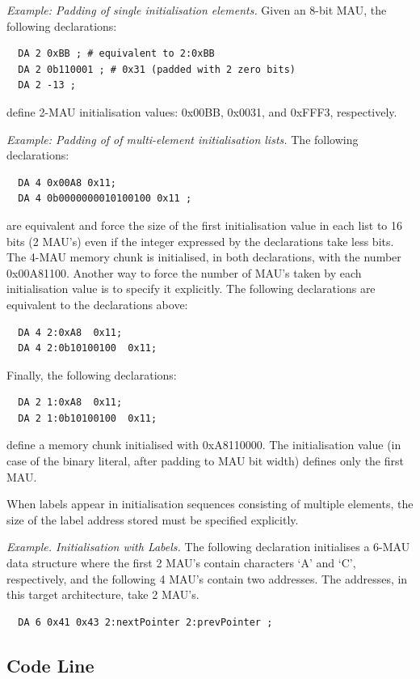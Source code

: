 \documentclass[a4paper,twoside]{tceusermanual}
\begin{document}
\emph{Example: Padding of single initialisation elements.}
%
Given an 8-bit MAU, the following declarations:
\begin{verbatim}
  DA 2 0xBB ; # equivalent to 2:0xBB
  DA 2 0b110001 ; # 0x31 (padded with 2 zero bits)
  DA 2 -13 ;
\end{verbatim}
define 2-MAU initialisation values: 0x00BB, 0x0031, and 0xFFF3,
respectively.

\emph{Example: Padding of of multi-element initialisation lists.}
%
The following declarations:
\begin{verbatim}
  DA 4 0x00A8 0x11;
  DA 4 0b0000000010100100 0x11 ;
\end{verbatim}
are equivalent and force the size of the first initialisation value in each
list to 16 bits (2 MAU's) even if the integer expressed by the declarations
take less bits. The 4-MAU memory chunk is initialised, in both declarations,
with the number 0x00A81100.
%
Another way to force the number of MAU's taken by each initialisation value
is to specify it explicitly.
%
The following declarations are equivalent to the declarations above:
\begin{verbatim}
  DA 4 2:0xA8  0x11;
  DA 4 2:0b10100100  0x11;
\end{verbatim}
%
Finally, the following declarations:
\begin{verbatim}
  DA 2 1:0xA8  0x11;
  DA 2 1:0b10100100  0x11;
\end{verbatim}
define a memory chunk initialised with 0xA8110000. The initialisation value
(in case of the binary literal, after padding to MAU bit width) defines
only the first MAU.

When labels appear in initialisation sequences consisting of multiple
elements, the size of the label address stored must be specified explicitly.

\emph{Example. Initialisation with Labels.}
%
The following declaration initialises a 6-MAU data structure where the first
2 MAU's contain characters `A' and `C', respectively, and the following 4
MAU's contain two addresses. The addresses, in this target architecture,
take 2 MAU's.
\begin{verbatim}
  DA 6 0x41 0x43 2:nextPointer 2:prevPointer ;
\end{verbatim}

\subsection{Code Line}
\label{ssec:code-line}
\end{document}
